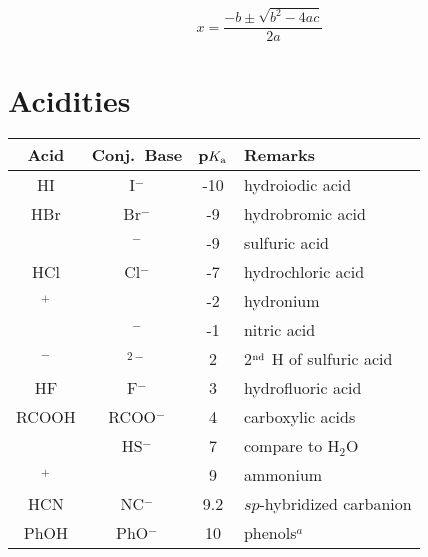\documentclass[10pt]{article}
\begin{document}
\begin{equation*}
x = \frac{-b\pm\sqrt{b^2-4ac}}{2a}
\end{equation*}

\newpage\section{Acidities}

\begin{center}
          \begin{tabular}{ccSl}
               \toprule
               Acid           &   Conj.\ Base      &  {p$K_\textnormal{a}$}      &   Remarks        \\
               \midrule
               HI             &   I$^{-}$          &  -10                        &   hydroiodic acid \\
               HBr            &   Br$^{-}$         &  -9                         &   hydrobromic acid \\
                    &   $^{-}$  &  -9                         &   sulfuric acid \\
               HCl            &   Cl$^{-}$         &  -7                         &   hydrochloric acid \\
               $^{+}$ &            &  -2                         &   hydronium \\
                     &   $^{-}$   &  -1                         &   nitric acid \\
               \midrule
               $^{-}$ & $^{2-}$   &   2                         &   2$^{\textnormal{nd}}$ H of sulfuric acid \\
               HF             &   F$^{-}$          &   3                         &   hydrofluoric acid \\
               RCOOH          &   RCOO$^{-}$       &   4                         &   carboxylic acids \\
                      &   HS$^{-}$         &   7                         &   compare to H$_2$O\\
               $^{+}$ &            &   9                         &   ammonium \\
               HCN            &   NC$^{-}$         &   9.2                       &   $sp$-hybridized carbanion \\
               PhOH           &   PhO$^{-}$        &   10                        &   phenols$^{\textit{a}}$ \\

\end{tabular}
\end{center}
\end{document}

